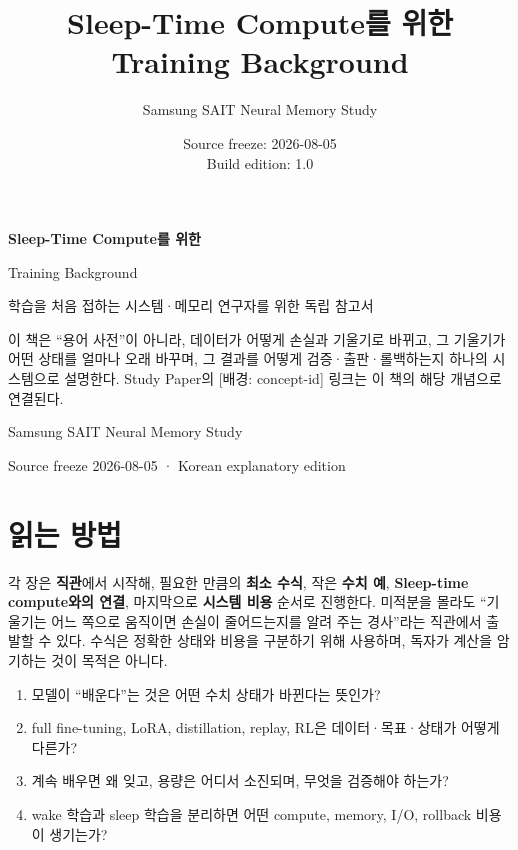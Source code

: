 \documentclass[11pt,a4paper,oneside,openany]{book}
\title{Sleep-Time Compute를 위한\\Training Background}
\author{Samsung SAIT Neural Memory Study}
\date{Source freeze: 2026-08-05\\Build edition: 1.0}
\begin{document}
\hypersetup{pageanchor=false}
\begin{titlepage}
  \centering
  \vspace*{20mm}
  {\sffamily\bfseries\color{STCNavy}\fontsize{28}{34}\selectfont
   Sleep-Time Compute를 위한\par Training Background\par}
  \vspace{8mm}
  {\Large 학습을 처음 접하는 시스템·메모리 연구자를 위한 독립 참고서\par}
  \vspace{18mm}
  \begin{tcolorbox}[width=0.84\textwidth,colback=STCMist,colframe=STCBlue,boxrule=0.8pt,arc=2mm]
  이 책은 ``용어 사전''이 아니라, 데이터가 어떻게 손실과 기울기로 바뀌고,
  그 기울기가 어떤 상태를 얼마나 오래 바꾸며, 그 결과를 어떻게 검증·출판·롤백하는지
  하나의 시스템으로 설명한다. Study Paper의 \textsf{[배경: concept-id]} 링크는 이 책의
  해당 개념으로 연결된다.
  \end{tcolorbox}
  \vfill
  {\sffamily Samsung SAIT Neural Memory Study\par}
  {\small Source freeze 2026-08-05 · Korean explanatory edition\par}
\end{titlepage}
\hypersetup{pageanchor=true}
\frontmatter

\chapter*{읽는 방법}
각 장은 \textbf{직관}에서 시작해, 필요한 만큼의 \textbf{최소 수식}, 작은
\textbf{수치 예}, \textbf{Sleep-time compute와의 연결}, 마지막으로
\textbf{시스템 비용} 순서로 진행한다. 미적분을 몰라도 ``기울기는 어느 쪽으로 움직이면
손실이 줄어드는지를 알려 주는 경사''라는 직관에서 출발할 수 있다. 수식은 정확한 상태와
비용을 구분하기 위해 사용하며, 독자가 계산을 암기하는 것이 목적은 아니다.

\begin{keypoint}[이 책이 답하는 질문]
\begin{enumerate}
  \item 모델이 ``배운다''는 것은 어떤 수치 상태가 바뀐다는 뜻인가?
  \item full fine-tuning, LoRA, distillation, replay, RL은 데이터·목표·상태가 어떻게 다른가?
  \item 계속 배우면 왜 잊고, 용량은 어디서 소진되며, 무엇을 검증해야 하는가?
  \item wake 학습과 sleep 학습을 분리하면 어떤 compute, memory, I/O, rollback 비용이 생기는가?
\end{enumerate}
\end{keypoint}
\end{document}
